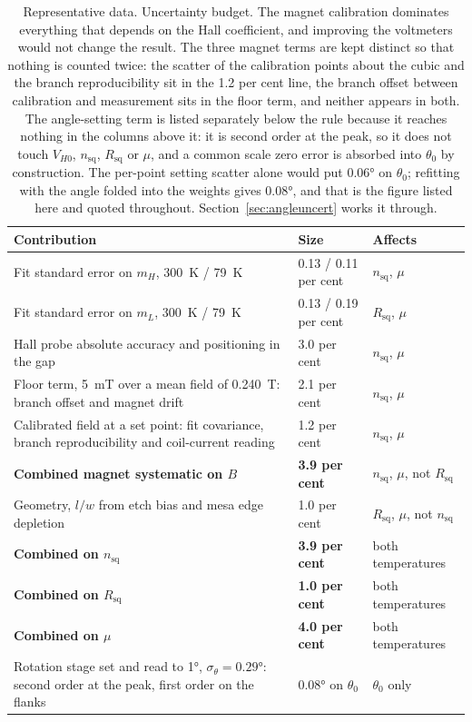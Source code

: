 \documentclass[11pt,a4paper]{article}
\newcommand{\Rsq}{R_{\mathrm{sq}}}
\newcommand{\nsq}{n_{\mathrm{sq}}}
\begin{document}
\begin{table}[htbp]
\centering
\caption{Representative data. Uncertainty budget. The magnet calibration dominates everything
that depends on the Hall coefficient, and improving the voltmeters would not change the
result. The three magnet terms are kept distinct so that nothing is counted twice: the
scatter of the calibration points about the cubic and the branch reproducibility sit in the
\num{1.2} per cent line, the branch offset between calibration and measurement sits in the
floor term, and neither appears in both. The angle-setting term is listed separately below the
rule because it reaches nothing in the columns above it: it is second order at the peak, so it
does not touch $V_{H0}$, $\nsq$, $\Rsq$ or $\mu$, and a common scale zero error is absorbed
into $\theta_0$ by construction. The per-point setting scatter alone would put \ang{0.06} on
$\theta_0$; refitting with the angle folded into the weights gives \ang{0.08}, and that is the
figure listed here and quoted throughout. Section~\ref{sec:angleuncert} works it through.}
\label{tab:budget}
\small
\begin{tabular}{p{}ll}
\toprule
Contribution & Size & Affects \\
\midrule
Fit standard error on $m_H$, \qty{300}{\kelvin} / \qty{79}{\kelvin} &
  0.13 / 0.11 per cent & $\nsq$, $\mu$ \\
Fit standard error on $m_L$, \qty{300}{\kelvin} / \qty{79}{\kelvin} &
  0.13 / 0.19 per cent & $\Rsq$, $\mu$ \\
Hall probe absolute accuracy and positioning in the gap & 3.0 per cent & $\nsq$, $\mu$ \\
Floor term, \qty{5}{\milli\tesla} over a mean field of \qty{0.240}{\tesla}: branch
  offset and magnet drift & 2.1 per cent & $\nsq$, $\mu$ \\
Calibrated field at a set point: fit covariance, branch reproducibility and
  coil-current reading & 1.2 per cent & $\nsq$, $\mu$ \\
\midrule
\textbf{Combined magnet systematic on $B$} & \textbf{3.9 per cent} &
  $\nsq$, $\mu$, not $\Rsq$ \\
Geometry, $l/w$ from etch bias and mesa edge depletion & 1.0 per cent &
  $\Rsq$, $\mu$, not $\nsq$ \\
\midrule
\textbf{Combined on $\nsq$} & \textbf{3.9 per cent} & both temperatures \\
\textbf{Combined on $\Rsq$} & \textbf{1.0 per cent} & both temperatures \\
\textbf{Combined on $\mu$} & \textbf{4.0 per cent} & both temperatures \\
\midrule
Rotation stage set and read to \ang{1}, $\sigma_\theta = \ang{0.29}$: second order at the
  peak, first order on the flanks & \ang{0.08} on $\theta_0$ & $\theta_0$ only \\
\bottomrule
\end{tabular}
\end{table}
\end{document}
